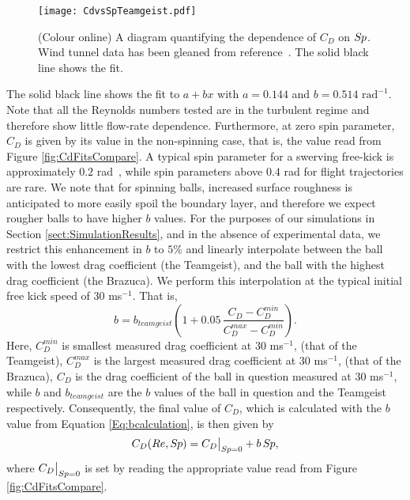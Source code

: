\documentclass[a4paper]{article}
\begin{document}
%
\begin{figure}[t] 
  \centering
  {\texttt{[image: CdvsSpTeamgeist.pdf]}}
  \caption{(Colour online) A diagram quantifying the dependence of $C_{D}$ on $S\!{\kern 0.125em}p$.  Wind tunnel data has been gleaned from reference~\cite{AsaiTSeoKKobayashiOandSakashitaR}.  The solid black line shows the fit.}
 \label{fig:CdvsSpTeamgesit}
\end{figure}
%
%
The solid black line shows the fit to $a + bx$ with $a=0.144$ and $b=0.514 \textrm{ rad}^{-1}$.  Note that all the Reynolds numbers tested are in the turbulent regime and therefore show little flow-rate dependence.   
Furthermore, at zero spin parameter, $C_D$ is given by its value in the non-spinning case, that is, the value read from Figure \ref{fig:CdFitsCompare}.  A typical spin parameter for a swerving free-kick is approximately $0.2$ rad~\cite{GoffJEandCarreMJ}, while spin parameters above $0.4$ rad for flight trajectories are rare.  We note that for spinning balls, increased surface roughness is anticipated to more easily spoil the boundary layer, and therefore we expect rougher balls to have higher $b$ values.  For the purposes of our simulations in Section \ref{sect:SimulationResults}, and in the absence of experimental data, we restrict this enhancement in $b$ to $5$\% and linearly interpolate between the ball with the lowest drag coefficient (the Teamgeist), and the ball with the highest drag coefficient (the Brazuca).  We perform this interpolation at the typical initial free kick speed of $30$ ms$^{-1}$.  That is, 
\begin{equation}\label{Eq:bcalculation}
b = b_{teamgeist}\left(1 + 0.05\,\frac{C_{D} - C_{D}^{min}}{C_{D}^{max} - C_{D}^{min}}\right).
\end{equation}
Here, $C_{D}^{min}$ is smallest measured drag coefficient at $30$ ms$^{-1}$, (that of the Teamgeist), $C_{D}^{max}$ is the largest measured drag coefficient at $30$ ms$^{-1}$, (that of the Brazuca), $C_{D}$ is the drag coefficient of the ball in question measured at $30$ ms$^{-1}$, while $b$ and $b_{teamgeist}$ are the $b$ values of the ball in question and the Teamgeist respectively.  Consequently, the final value of $C_D$, which is calculated with the $b$ value from Equation \ref{Eq:bcalculation}, is then given by
%
\begin{equation}
C_D(Re, S\!{\kern 0.125em}p) = C_D\big|_{S\!{\kern 0.125em}p = 0} + b\,S\!{\kern 0.125em}p,
\end{equation}
% 
where $C_D\big|_{S\!{\kern 0.125em}p = 0}$ is set by reading the appropriate value read from Figure \ref{fig:CdFitsCompare}.
\end{document}
